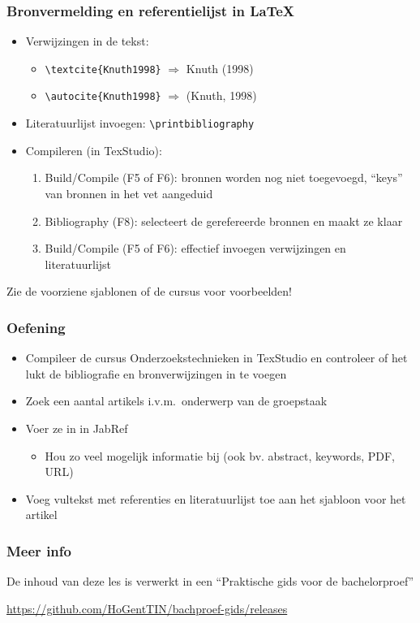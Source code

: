 \documentclass{beamer}
\begin{document}
\begin{frame}[fragile]
  \frametitle{Bronvermelding en referentielijst in {\LaTeX}}
  
  \begin{itemize}
  \item Verwijzingen in de tekst:
  
  \begin{itemize}
    \item \verb|\textcite{Knuth1998}| $\Rightarrow$ Knuth (1998)
    \item \verb|\autocite{Knuth1998}| $\Rightarrow$ (Knuth, 1998)
  \end{itemize}
  
  \item Literatuurlijst invoegen: \verb|\printbibliography|
  
  \item Compileren (in TexStudio):
  
  \begin{enumerate}
    \item Build/Compile (F5 of F6): bronnen worden nog niet toegevoegd, ``keys'' van bronnen in het vet aangeduid
    \item Bibliography (F8): selecteert de gerefereerde bronnen en maakt ze klaar
    \item Build/Compile (F5 of F6): effectief invoegen verwijzingen en literatuurlijst
  \end{enumerate}
  \end{itemize}
  
  Zie de voorziene sjablonen of de cursus voor voorbeelden!
\end{frame}

\begin{frame}
  \frametitle{Oefening}

  \begin{itemize}
    \item Compileer de cursus Onderzoekstechnieken in TexStudio en controleer of het lukt de bibliografie en bronverwijzingen in te voegen
    \item Zoek een aantal artikels i.v.m.~onderwerp van de groepstaak
    \item Voer ze in in JabRef
      \begin{itemize}
        \item Hou zo veel mogelijk informatie bij (ook bv. abstract, keywords, PDF, URL)
      \end{itemize}
    \item Voeg vultekst met referenties en literatuurlijst toe aan het sjabloon voor het artikel
  \end{itemize}
\end{frame}

\begin{frame}
  \frametitle{Meer info}
  
  De inhoud van deze les is verwerkt in een ``Praktische gids voor de bachelorproef''
  
  \vspace{12pt}
  
  \url{https://github.com/HoGentTIN/bachproef-gids/releases}
  
\end{frame}
\end{document}

